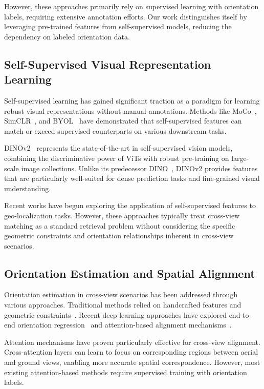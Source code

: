 However, these approaches primarily rely on supervised learning with orientation labels, requiring extensive annotation efforts. Our work distinguishes itself by leveraging pre-trained features from self-supervised models, reducing the dependency on labeled orientation data.

\subsection{Self-Supervised Visual Representation Learning}

Self-supervised learning has gained significant traction as a paradigm for learning robust visual representations without manual annotations. Methods like MoCo~\cite{he2020momentum}, SimCLR~\cite{chen2020simple}, and BYOL~\cite{grill2020bootstrap} have demonstrated that self-supervised features can match or exceed supervised counterparts on various downstream tasks.

DINOv2~\cite{oquab2023dinov2} represents the state-of-the-art in self-supervised vision models, combining the discriminative power of ViTs with robust pre-training on large-scale image collections. Unlike its predecessor DINO~\cite{caron2021emerging}, DINOv2 provides features that are particularly well-suited for dense prediction tasks and fine-grained visual understanding.

Recent works have begun exploring the application of self-supervised features to geo-localization tasks. However, these approaches typically treat cross-view matching as a standard retrieval problem without considering the specific geometric constraints and orientation relationships inherent in cross-view scenarios.

\subsection{Orientation Estimation and Spatial Alignment}

Orientation estimation in cross-view scenarios has been addressed through various approaches. Traditional methods relied on handcrafted features and geometric constraints~\cite{bansal2011ultra,lin2015learning}. Recent deep learning approaches have explored end-to-end orientation regression~\cite{workman2015predicting} and attention-based alignment mechanisms~\cite{shi2020where}.

Attention mechanisms have proven particularly effective for cross-view alignment. Cross-attention layers can learn to focus on corresponding regions between aerial and ground views, enabling more accurate spatial correspondence. However, most existing attention-based methods require supervised training with orientation labels.

